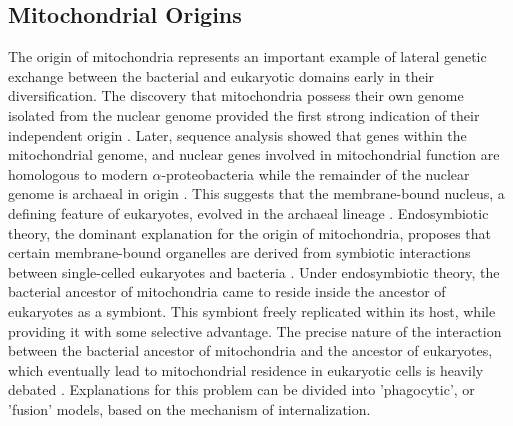 \documentclass[12pt,twoside]{reedthesis}
\begin{document}
\subsection{Mitochondrial Origins}
The origin of mitochondria represents an important example of lateral genetic exchange between the bacterial and eukaryotic domains early in their diversification. 
The discovery that mitochondria possess their own genome isolated from the nuclear genome provided the first strong indication of their independent origin \citep{nass_intramitochondrial_1963}.
Later, sequence analysis showed that genes within the mitochondrial genome, and nuclear genes involved in mitochondrial function are homologous to modern \(\alpha\)-proteobacteria while the remainder of the nuclear genome is archaeal in origin \citep{doolittle_tempo_1994, iwabe_evolutionary_1989}. 
This suggests that the membrane-bound nucleus, a defining feature of eukaryotes, evolved in the archaeal lineage \citep{embley_eukaryotic_2006}. 
Endosymbiotic theory, the dominant explanation for the origin of mitochondria, proposes that certain membrane-bound organelles are derived from symbiotic interactions between single-celled eukaryotes and bacteria \citep{margulis_origin_1970, martin_endosymbiotic_2015}.
Under endosymbiotic theory, the bacterial ancestor of mitochondria came to reside inside the ancestor of eukaryotes as a symbiont.
This symbiont freely replicated within its host, while providing it with some selective advantage.
The precise nature of the interaction between the bacterial ancestor of mitochondria and the ancestor of eukaryotes, which eventually lead to mitochondrial residence in eukaryotic cells is heavily debated \citep{martin_endosymbiotic_2015}.
Explanations for this problem can be divided into 'phagocytic', or 'fusion' models, based on the mechanism of internalization.
\end{document}
